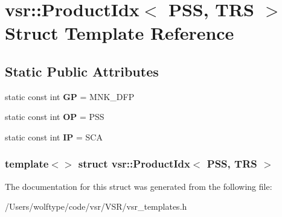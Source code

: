 \hypertarget{structvsr_1_1_product_idx_3_01_p_s_s_00_01_t_r_s_01_4}{\section{vsr\-:\-:Product\-Idx$<$ P\-S\-S, T\-R\-S $>$ Struct Template Reference}
\label{structvsr_1_1_product_idx_3_01_p_s_s_00_01_t_r_s_01_4}
}
\subsection*{Static Public Attributes}
\begin{DoxyCompactItemize}
\item 
\hypertarget{structvsr_1_1_product_idx_3_01_p_s_s_00_01_t_r_s_01_4_a69391e951a1f5ac42bbc817358ddb162}{static const int {\bfseries G\-P} = M\-N\-K\-\_\-\-D\-F\-P}\label{structvsr_1_1_product_idx_3_01_p_s_s_00_01_t_r_s_01_4_a69391e951a1f5ac42bbc817358ddb162}

\item 
\hypertarget{structvsr_1_1_product_idx_3_01_p_s_s_00_01_t_r_s_01_4_a629913076ddbd83ff18e707eb9918d57}{static const int {\bfseries O\-P} = P\-S\-S}\label{structvsr_1_1_product_idx_3_01_p_s_s_00_01_t_r_s_01_4_a629913076ddbd83ff18e707eb9918d57}

\item 
\hypertarget{structvsr_1_1_product_idx_3_01_p_s_s_00_01_t_r_s_01_4_a6e2446997ba0c670e10d8dc81f6b6529}{static const int {\bfseries I\-P} = S\-C\-A}\label{structvsr_1_1_product_idx_3_01_p_s_s_00_01_t_r_s_01_4_a6e2446997ba0c670e10d8dc81f6b6529}

\end{DoxyCompactItemize}
\subsubsection*{template$<$$>$ struct vsr\-::\-Product\-Idx$<$ P\-S\-S, T\-R\-S $>$}



The documentation for this struct was generated from the following file\-:\begin{DoxyCompactItemize}
\item 
/\-Users/wolftype/code/vsr/\-V\-S\-R/vsr\-\_\-templates.\-h\end{DoxyCompactItemize}
